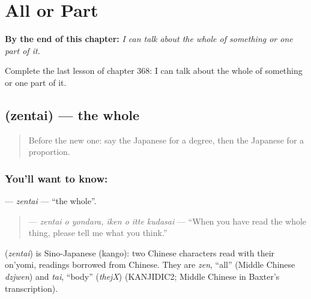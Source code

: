 
\chapter{All or Part}
\label{ch:ja-all-or-part}

\begin{chapteropening}
\textbf{By the end of this chapter:} \emph{I can talk about the whole of something or one part of it.}

Complete the last lesson of chapter 368: I can talk about the whole of something or one part of it.
\end{chapteropening}

\section[\texorpdfstring{\ja{ぜんたい} (zentai)}{ぜんたい (zentai)}]{ (zentai) — the whole}

\label{lesson:JA-C368-zentai}



\begin{quote}
Before the new one: say the Japanese for a degree, then the Japanese for a proportion.
\end{quote}

\subsection*{You'll want to know: }
\textbf{} — \emph{zentai} — \textquotedblleft{}the whole\textquotedblright{}.

\begin{quote}
\textbf{   } — \emph{zentai o yondara, iken o itte kudasai} — \textquotedblleft{}When you have read the whole thing, please tell me what you think.\textquotedblright{}
\end{quote}

\begin{cousinweb}
\textbf{} (\emph{zentai}) is Sino-Japanese (kango): two Chinese characters read with their on'yomi, readings borrowed from Chinese. They are \emph{zen}, \textquotedblleft{}all\textquotedblright{} (Middle Chinese \emph{dzjwen}) and \emph{tai}, \textquotedblleft{}body\textquotedblright{} (\emph{thejX}) (KANJIDIC2; Middle Chinese in Baxter's transcription).
\end{cousinweb}

